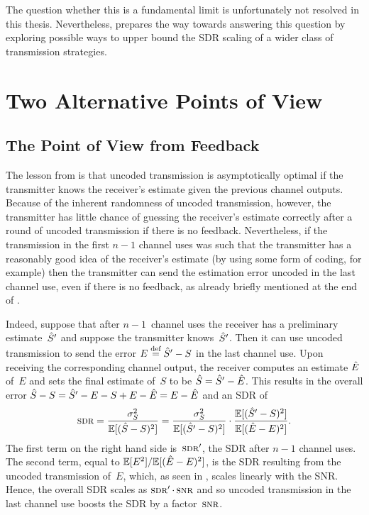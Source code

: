 The question whether this is a fundamental limit is unfortunately not resolved
in this thesis.  Nevertheless,  prepares the way towards
answering this question by exploring possible ways to upper bound the SDR
scaling of  a wider class of transmission strategies. 


\section{Two Alternative Points of View}\label{sec:twoperspectives}

\subsection{The Point of View from Feedback}

The lesson from  is that uncoded transmission is asymptotically
optimal if the transmitter knows the receiver's estimate given the previous
channel outputs.  Because of the inherent randomness of uncoded transmission,
however, the transmitter has little chance of guessing the receiver's estimate
correctly after a round of uncoded transmission if there is no feedback.
Nevertheless, if the transmission in the first $n-1$ channel uses was such that
the transmitter has a reasonably good idea of the receiver's estimate (by using
some form of coding, for example) then the transmitter can send the estimation
error uncoded in the last channel use, even if there is no feedback, as already
briefly mentioned at the end of . 

Indeed, suppose that after $n-1$~channel uses the receiver has a preliminary
estimate~${\hat{S}}'$ and suppose the transmitter knows~${\hat{S}}'$. Then it 
can use uncoded transmission to send the error $E \stackrel{\text{def}}{=} {\hat{S}}' - S$ in the last
channel use. Upon receiving the corresponding channel output, the receiver
computes an estimate $\hat{E}$ of~$E$ and sets the final estimate of~$S$ to be ${\hat{S}}
= {\hat{S}}' - \hat{E}$. This results in the overall error ${\hat{S}} - S = {\hat{S}}' - E - S + E -
\hat{E} = E - \hat{E}$ and an SDR of
\begin{equation*}
  \sdr = \frac{\ssq}{\mse} = \frac{\ssq}{\E[(\Sh' - S)^2]} \cdot
  \frac{\E[(\Sh' - S)^2]}{\msee}.
\end{equation*}
The first term on the right hand side is~$\sdr'$, the SDR after $n-1$ channel
uses. The second term, equal to $\mathbb{E}[E^2]/{\mathbb{E}[(\hat{E} - E)^2]}$, is the SDR resulting from the
uncoded transmission of~$E$, which, as seen in , scales
linearly with the SNR. Hence, the overall SDR scales as $\sdr' \cdot \snr$ and
so uncoded transmission in the last channel use boosts the SDR by a
factor~$\snr$. 

